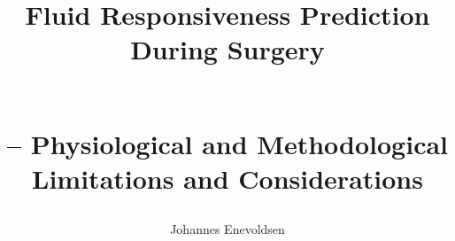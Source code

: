 \documentclass[a4paper, nobind]{templates/ociamthesis}
\title{Fluid Responsiveness Prediction\\
During Surgery\\
\strut \\
\LARGE -- Physiological and Methodological\\
Limitations and Considerations\\}
\author{Johannes Enevoldsen}
\begin{document}
\setlength{\textbaselineskip}{22pt plus2pt}

\setlength{\frontmatterbaselineskip}{17pt plus1pt minus1pt}

\setlength{\abstractseparatelineskip}{13pt plus1pt minus1pt}
\setlength{\abstractseparateparskip}{0pt plus 1pt}

\setlength{\parskip}{2pt plus 1pt}

%
%
\def\crest{{\texttt{[image: templates/AU\\\_SEGL/blue/ausegl\\\_blaa.pdf]}}}
\renewcommand{\university}{Aarhus University}
\renewcommand{\submittedtext}{PhD dissertation}
\renewcommand{\thesistitlesize}{\fontsize{22pt}{28pt}\selectfont}
\renewcommand{\gapbeforecrest}{25mm}
\renewcommand{\gapaftercrest}{25mm}


\setlength{\baselineskip}{\textbaselineskip}



\setcounter{secnumdepth}{2}
\setcounter{tocdepth}{1}


\end{document}

